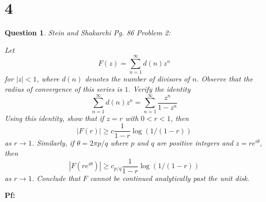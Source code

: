 \documentclass{article}
\newtheorem{question}{Question}
\begin{document}
\section*{4}
\begin{myBox}[]{}
    \begin{question}
        Stein and Shakarchi Pg. 86 Problem 2:

        Let 
        $$F(z)=\sum_{n=1}^{\infty}d(n)z^n$$
        for $|z|<1$, where $d(n)$ denotes the number of divisors of $n$. Observe that the radius of convergence of this series is $1$.
        Verify the identity
        $$\sum_{n=1}^{\infty}d(n)z^n=\sum_{n=1}^{\infty}\frac{z^n}{1-z^n}$$
        Using this identity, show that if $z=r$ with $0<r<1$, then
        $$|F(r)|\geq c\frac{1}{1-r}\log(1/(1-r))$$
        as $r\rightarrow 1$. Similarly, if $\theta = 2\pi p/q$ where $p$ and $q$ are positive integers and $z=re^{i\theta}$, then
        $$|F(re^{i\theta})|\geq c_{p/q}\frac{1}{1-r}\log(1/(1-r))$$
        as $r\rightarrow 1$. Conclude that $F$ cannot be continued analytically past the unit disk.
    \end{question}
\end{myBox}

\textbf{Pf:}
\end{document}
